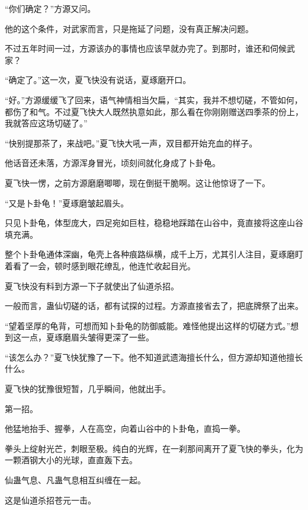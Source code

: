 \begin{this_body}
“你们确定？”方源又问。

他的这个条件，对武家而言，只是拖延了问题，没有真正解决问题。

不过五年时间一过，方源该办的事情也应该早就办完了。到那时，谁还和伺候武家？

“确定了。”这一次，夏飞快没有说话，夏琢磨开口。

“好。”方源缓缓飞了回来，语气神情相当欠扁，“其实，我并不想切磋，不管如何，都伤了和气。不过夏飞快大人既然执意如此，那么看在你刚刚赠送四季茶的份上，我就答应这场切磋了。”

“快别提那茶了，来战吧。”夏飞快大吼一声，双目都开始充血的样子。

他话音还未落，方源浑身冒光，顷刻间就化身成了卜卦龟。

夏飞快一愣，之前方源磨磨唧唧，现在倒挺干脆啊。这让他惊讶了一下。

“又是卜卦龟！”夏琢磨皱起眉头。

只见卜卦龟，体型庞大，四足宛如巨柱，稳稳地踩踏在山谷中，竟直接将这座山谷填充满。

整个卜卦龟通体深幽，龟壳上各种痕路纵横，成千上万，尤其引人注目，夏琢磨盯着看了一会，顿时感到眼花缭乱，他连忙收起目光。

夏飞快没有料到方源一下子就使出了仙道杀招。

一般而言，蛊仙切磋的话，都有试探的过程。方源直接省去了，把底牌祭了出来。

“望着坚厚的龟背，可想而知卜卦龟的防御威能。难怪他提出这样的切磋方式。”想到这一点，夏琢磨眉头皱得更深了一些。

“该怎么办？”夏飞快犹豫了一下。他不知道武遗海擅长什么，但方源却知道他擅长什么。

夏飞快的犹豫很短暂，几乎瞬间，他就出手。

第一招。

他猛地抬手、握拳，人在高空，向着山谷中的卜卦龟，直捣一拳。

拳头上绽射光芒，刺眼至极。纯白的光辉，在一刹那间离开了夏飞快的拳头，化为一颗酒钢大小的光球，直直轰下去。

仙蛊气息、凡蛊气息相互纠缠在一起。

这是仙道杀招苍元一击。

\end{this_body}

